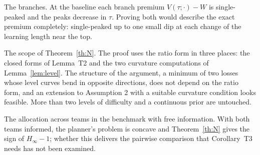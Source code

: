\documentclass[11pt]{article}
\theoremstyle{definition}
\begin{document}
The branches. At the baseline each branch premium $V(\tau;\cdot)-W$ is single-peaked and the peaks decrease in $\tau$. Proving both would describe the exact premium completely: single-peaked up to one small dip at each change of the learning length near the top.

The scope of Theorem~\ref{th:N}. The proof uses the ratio form in three places: the closed forms of Lemma~T2 and the two curvature computations of Lemma~\ref{lem:level}. The structure of the argument, a minimum of two losses whose level curves bend in opposite directions, does not depend on the ratio form, and an extension to Assumption 2 with a suitable curvature condition looks feasible. More than two levels of difficulty and a continuous prior are untouched.

The allocation across teams in the benchmark with free information. With both teams informed, the planner's problem is concave and Theorem~\ref{th:N} gives the sign of $H_\infty-1$; whether this delivers the pairwise comparison that Corollary~T3 needs has not been examined.
\end{document}
